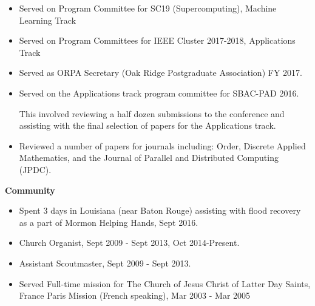 \documentclass{article}
\begin{document}
	\begin{itemize}
        \item Served on Program Committee for SC19 (Supercomputing), Machine Learning Track 
		\item Served on Program Committees for IEEE Cluster 2017-2018, Applications Track
		\item Served as ORPA Secretary (Oak Ridge Postgraduate Association) FY 2017.
		\item Served on the Applications track program committee for SBAC-PAD 2016.

		This involved reviewing a half dozen submissions to the conference and assisting with
		the final selection of papers for the Applications track.
	
		\item Reviewed a number of papers for journals including: Order, Discrete Applied Mathematics,
        and the Journal of Parallel and Distributed Computing (JPDC).
%	
	\end{itemize}

\medskip

\Large \textbf{Community} \normalsize

\medskip

	\begin{itemize}

		\item Spent 3 days in Louisiana (near Baton Rouge) assisting with flood recovery
        as a part of Mormon Helping Hands, Sept 2016.
		\item Church Organist, Sept 2009 - Sept 2013, Oct 2014-Present.
		\item Assistant Scoutmaster, Sept 2009 - Sept 2013.
		\item Served Full-time mission for The Church of Jesus Christ of Latter Day Saints,
        France Paris Mission (French speaking), Mar 2003 - Mar 2005

	\end{itemize}
\end{document}
